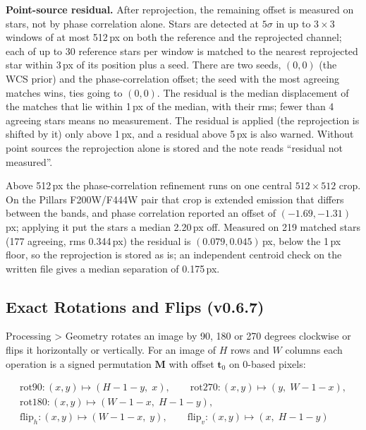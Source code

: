 \documentclass[11pt,a4paper]{article}
\newcommand{\mat}[1]{\mathbf{#1}}
\begin{document}
    \textbf{Point-source residual.} After reprojection, the remaining offset is measured on stars, not by phase correlation alone. Stars are detected at $5\sigma$ in up to $3 \times 3$ windows of at most 512\,px on both the reference and the reprojected channel; each of up to 30 reference stars per window is matched to the nearest reprojected star within 3\,px of its position plus a seed. There are two seeds, $(0, 0)$ (the WCS prior) and the phase-correlation offset; the seed with the most agreeing matches wins, ties going to $(0,0)$. The residual is the median displacement of the matches that lie within 1\,px of the median, with their rms; fewer than 4 agreeing stars means no measurement. The residual is applied (the reprojection is shifted by it) only above 1\,px, and a residual above 5\,px is also warned. Without point sources the reprojection alone is stored and the note reads ``residual not measured''.

    \begin{notebox}
        Above 512\,px the phase-correlation refinement runs on one central $512 \times 512$ crop. On the Pillars F200W/F444W pair that crop is extended emission that differs between the bands, and phase correlation reported an offset of $(-1.69, -1.31)$\,px; applying it put the stars a median 2.20\,px off. Measured on 219 matched stars (177 agreeing, rms 0.344\,px) the residual is $(0.079, 0.045)$\,px, below the 1\,px floor, so the reprojection is stored as is; an independent centroid check on the written file gives a median separation of 0.175\,px.
    \end{notebox}

    \subsection{Exact Rotations and Flips (v0.6.7)}
    \label{sec:geometry_math}

    Processing \textgreater{} Geometry rotates an image by 90, 180 or 270 degrees clockwise or flips it horizontally or vertically. For an image of $H$ rows and $W$ columns each operation is a signed permutation $\mat{M}$ with offset $\mathbf{t}_0$ on 0-based pixels:

    \begin{equation}
        \begin{gathered}
        \text{rot90}: (x, y) \mapsto (H{-}1{-}y,\; x), \qquad
        \text{rot270}: (x, y) \mapsto (y,\; W{-}1{-}x), \\[4pt]
        \text{rot180}: (x, y) \mapsto (W{-}1{-}x,\; H{-}1{-}y), \\[4pt]
        \text{flip}_h: (x, y) \mapsto (W{-}1{-}x,\; y), \qquad
        \text{flip}_v: (x, y) \mapsto (x,\; H{-}1{-}y)
        \end{gathered}
    \end{equation}
\end{document}
